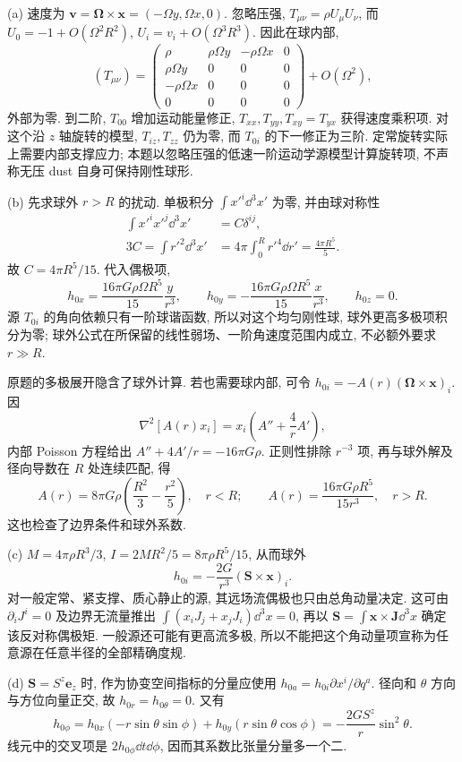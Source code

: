 \begin{solution}
(a) 速度为 $\boldsymbol v=\boldsymbol\Omega\times\boldsymbol x=(-\Omega y,\Omega x,0)$. 忽略压强, $T_{\mu\nu}=\rho U_\mu U_\nu$, 而 $U_0=-1+O(\Omega^2R^2)$, $U_i=v_i+O(\Omega^3R^3)$. 因此在球内部,
\[
(T_{\mu\nu})=
\begin{pmatrix}
\rho&\rho\Omega y&-\rho\Omega x&0\\
\rho\Omega y&0&0&0\\
-\rho\Omega x&0&0&0\\
0&0&0&0
\end{pmatrix}+O(\Omega^2),
\]
外部为零. 到二阶, $T_{00}$ 增加运动能量修正, $T_{xx},T_{yy},T_{xy}=T_{yx}$ 获得速度乘积项. 对这个沿 $z$ 轴旋转的模型, $T_{iz},T_{zz}$ 仍为零, 而 $T_{0i}$ 的下一修正为三阶. 定常旋转实际上需要内部支撑应力; 本题以忽略压强的低速一阶运动学源模型计算旋转项, 不声称无压 dust 自身可保持刚性球形.

(b) 先求球外 $r>R$ 的扰动. 单极积分 $\int x'^i\dd^3x'$ 为零, 并由球对称性
\begin{align*}
\int x'^ix'^j\dd^3x'&=C\delta^{ij},\\
3C=\int r'^2\dd^3x'&=4\pi\int_0^Rr'^4\dd r'=\frac{4\pi R^5}{5}.
\end{align*}
故 $C=4\pi R^5/15$. 代入偶极项,
\[
h_{0x}=\frac{16\pi G\rho\Omega R^5}{15}\frac{y}{r^3},\qquad
h_{0y}=-\frac{16\pi G\rho\Omega R^5}{15}\frac{x}{r^3},\qquad
h_{0z}=0.
\]
源 $T_{0i}$ 的角向依赖只有一阶球谐函数, 所以对这个均匀刚性球, 球外更高多极项积分为零; 球外公式在所保留的线性弱场、一阶角速度范围内成立, 不必额外要求 $r\gg R$.

原题的多极展开隐含了球外计算. 若也需要球内部, 可令 $h_{0i}=-A(r)(\boldsymbol\Omega\times\boldsymbol x)_i$. 因
\[
\nabla^2[A(r)x_i]=x_i\left(A''+\frac4rA'\right),
\]
内部 Poisson 方程给出 $A''+4A'/r=-16\pi G\rho$. 正则性排除 $r^{-3}$ 项, 再与球外解及径向导数在 $R$ 处连续匹配, 得
\[
A(r)=8\pi G\rho\left(\frac{R^2}{3}-\frac{r^2}{5}\right),\quad r<R;
\qquad A(r)=\frac{16\pi G\rho R^5}{15r^3},\quad r>R.
\]
这也检查了边界条件和球外系数.

(c) $M=4\pi\rho R^3/3$, $I=2MR^2/5=8\pi\rho R^5/15$, 从而球外
\[
h_{0i}=-\frac{2G}{r^3}(\boldsymbol S\times\boldsymbol x)_i.
\]
对一般定常、紧支撑、质心静止的源, 其远场流偶极也只由总角动量决定. 这可由 $\partial_iJ^i=0$ 及边界无流量推出 $\int(x_iJ_j+x_jJ_i)\dd^3x=0$, 再以 $\boldsymbol S=\int\boldsymbol x\times\boldsymbol J\dd^3x$ 确定该反对称偶极矩. 一般源还可能有更高流多极, 所以不能把这个角动量项宣称为任意源在任意半径的全部精确度规.

(d) $\boldsymbol S=S^z\boldsymbol e_z$ 时, 作为协变空间指标的分量应使用 $h_{0a}=h_{0i}\partial x^i/\partial q^a$. 径向和 $\theta$ 方向与方位向量正交, 故 $h_{0r}=h_{0\theta}=0$. 又有
\[
h_{0\phi}
=h_{0x}(-r\sin\theta\sin\phi)+h_{0y}(r\sin\theta\cos\phi)
=-\frac{2GS^z}{r}\sin^2\theta.
\]
线元中的交叉项是 $2h_{0\phi}\dd t\dd\phi$, 因而其系数比张量分量多一个二.
\end{solution}


